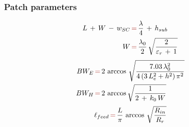 \documentclass[12pt,a4paper]{book}
\begin{document}
{\subsubsection*{\selectfont\color{Turquoise}Patch parameters}
\begin{equation}\begin{aligned}L\,+\,W\,-\,w_{SC}\,&{\color{Mahogany}=}\,\frac{\lambda}{4}\,+\,h_{sub}\\
W\,&{\color{Mahogany}=}\,\frac{\lambda_0}{2}\,\sqrt{\frac{2}{\varepsilon_r\,+\,1}}\\
\end{aligned}
\end{equation}
\begin{equation}
\begin{aligned}
BW_E\,&{\color{Mahogany}=}\,2\,\arccos\,\sqrt{\frac{7.03\,\lambda_0^2}{4\,(3\,L_e^2+h^2)\,\pi^2}}\\
BW_H\,&{\color{Mahogany}=}\,2\,\arccos\sqrt{\frac{1}{2\,+\,k_0\,W}}\\
\end{aligned}
\end{equation}
\begin{equation}
\ell_{feed}\,{\color{Mahogany}=}\,\frac{L}{\pi}\,\arccos\,\sqrt{\frac{R_{in}}{R_r}}
\end{equation}

}
\end{document}
